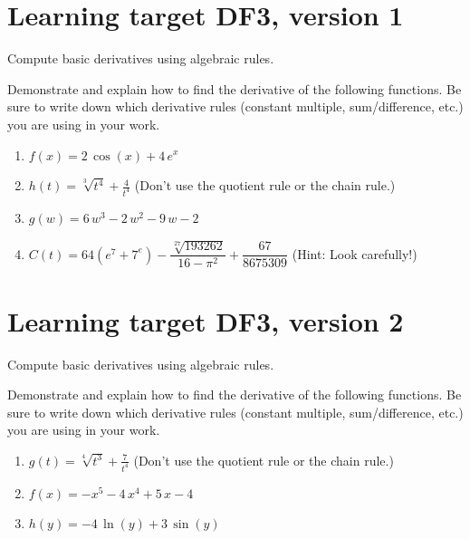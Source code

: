 
\usepackage{pgfplots}

\everymath{\displaystyle}


\section{Learning target DF3, version 1}

Compute basic derivatives using algebraic rules.

\hrulefill

Demonstrate and explain how to find the derivative of the following functions. Be sure to write down which derivative rules (constant multiple, sum/difference, etc.) you are using in your work.

\begin{enumerate}
    \item \(f(x) = 2 \, \cos\left(x\right) + 4 \, e^{x}\) 
    \vfill
    \item \(h(t) = \sqrt[3]{t^4} + \frac{4}{t^{4}}\) \quad (Don't use the quotient rule or the chain rule.)
    \vfill
    \item \(g(w) = 6 \, w^{3} - 2 \, w^{2} - 9 \, w - 2\)
    \vfill
    \item \(C(t) = 64(e^7 + 7^e)- \dfrac{\sqrt[27]{193262}}{16-\pi^2} + \dfrac{67}{8675309}\) \quad
(Hint: Look carefully!)
\end{enumerate}



\pagebreak

\section{Learning target DF3, version 2}

Compute basic derivatives using algebraic rules.

\hrulefill

Demonstrate and explain how to find the derivative of the following functions. Be sure to write down which derivative rules (constant multiple, sum/difference, etc.) you are using in your work.

\begin{enumerate}
    \item \(g(t) = \sqrt[4]{t^3} + \frac{7}{t^{4}}\) \quad (Don't use the quotient rule or the chain rule.)
    \vfill
    \item \(f(x) = -x^{5} - 4 \, x^{4} + 5 \, x - 4\)
    \vfill
    \item \(h(y) = -4 \, \ln\left(y\right) + 3 \, \sin\left(y\right)\)
    \vfill
\end{enumerate}

